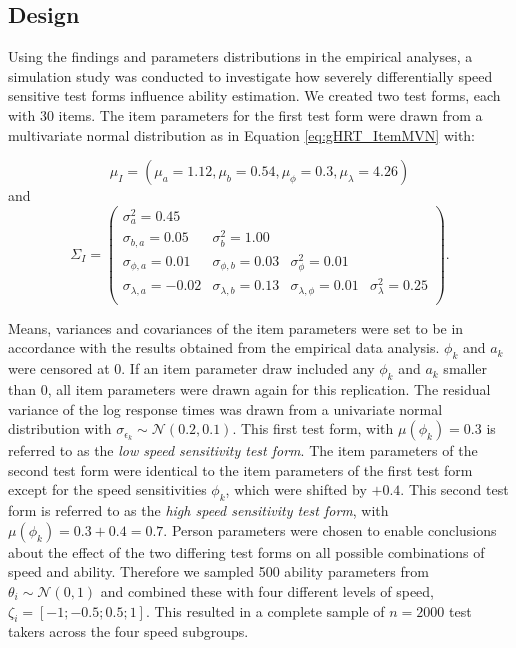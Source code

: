 \documentclass[a4paper,man,apacite,floatsintext,donotrepeattitle]{apa6}
\begin{document}
\subsection{Design}
Using the findings and parameters distributions in the empirical analyses, a simulation study was conducted to investigate how severely differentially speed sensitive test forms influence ability estimation. We created two test forms, each with 30 items. The item parameters for the first test form were drawn from a multivariate normal distribution as in Equation \ref{eq:gHRT_ItemMVN} with: 

\begin{equation}
	\mu_{I} = (\mu_{a} = 1.12, \mu_{b} = 0.54, \mu_{\phi} = 0.3, \mu_{\lambda} = 4.26)
\end{equation}
and
\begin{equation}
	\Sigma_I =	\begin{pmatrix}
\sigma^2_{a} = 0.45 &  &  &  \\
\sigma_{b, a} = 0.05 & \sigma^2_{b} = 1.00 &  &  \\
\sigma_{\phi, a} = 0.01 & \sigma_{\phi, b} = 0.03 & \sigma_{\phi}^2 = 0.01 &  \\
\sigma_{\lambda, a} = -0.02 & \sigma_{\lambda, b} = 0.13 & \sigma_{\lambda, \phi} = 0.01 & \sigma^2_{\lambda} = 0.25 \\
	\end{pmatrix}.	
\end{equation}

Means, variances and covariances of the item parameters were set to be in accordance with the results obtained from the empirical data analysis. $\phi_{k}$ and $a_{k}$ were censored at 0. If an item parameter draw included any $\phi_{k}$ and $a_{k}$ smaller than 0, all item parameters were drawn again for this replication. The residual variance of the log response times was drawn from a univariate normal distribution with $\sigma_{\epsilon_{k}} \sim \mathcal{N}(0.2, 0.1)$. This first test form, with $\mu(\phi_{k}) = 0.3$ is referred to as the \textit{low speed sensitivity test form}. The item parameters of the second test form were identical to the item parameters of the first test form except for the speed sensitivities $\phi_{k}$, which were shifted by $ + 0.4$. This second test form is referred to as the \textit{high speed sensitivity test form}, with $\mu(\phi_{k}) = 0.3 + 0.4 = 0.7$. Person parameters were chosen to enable conclusions about the effect of the two differing test forms on all possible combinations of speed and ability. Therefore we sampled 500 ability parameters from $\theta_{i} \sim \mathcal{N}(0, 1)$ and combined these with four different levels of speed, $\zeta_{i} = [-1; -0.5; 0.5; 1]$. This resulted in a complete sample of $n = 2000$ test takers across the four speed subgroups. 
\end{document}
